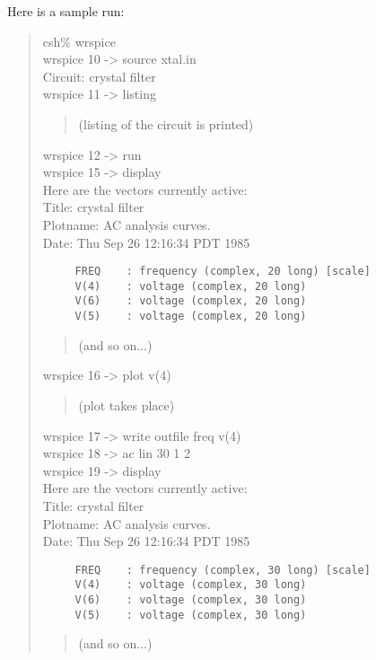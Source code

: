 Here is a sample {\WRspice} run:
\begin{quote} {\raggedright\vt
 csh\% wrspice\\
 wrspice 10 -> source xtal.in\\
 Circuit: crystal filter\\

 wrspice 11 -> listing\\
 \begin{quote}
  {\rm (listing of the circuit is printed)}
 \end{quote}

 wrspice 12 -> run\\
 wrspice 15 -> display\\
 Here are the vectors currently active:\\

 Title: crystal filter\\
 Plotname: AC analysis curves.\\
 Date: Thu Sep 26 12:16:34 PDT 1985\\
 \begin{verbatim}
     FREQ    : frequency (complex, 20 long) [scale]
     V(4)    : voltage (complex, 20 long)
     V(6)    : voltage (complex, 20 long)
     V(5)    : voltage (complex, 20 long)
 \end{verbatim}
 \begin{quote}
  {\rm (and so on...)}
 \end{quote}

 wrspice 16 -> plot v(4)\\
 \begin{quote}
  {\rm (plot takes place)}
 \end{quote}

 wrspice 17 -> write outfile freq v(4)\\
 wrspice 18 -> ac lin 30 1 2\\
 wrspice 19 -> display\\
 Here are the vectors currently active:\\

 Title: crystal filter\\
 Plotname: AC analysis curves.\\
 Date: Thu Sep 26 12:16:34 PDT 1985\\

 \begin{verbatim}
     FREQ    : frequency (complex, 30 long) [scale]
     V(4)    : voltage (complex, 30 long)
     V(6)    : voltage (complex, 30 long)
     V(5)    : voltage (complex, 30 long)
 \end{verbatim}
 \begin{quote}
  {\rm (and so on...)}
 \end{quote}

}
\end{quote}
